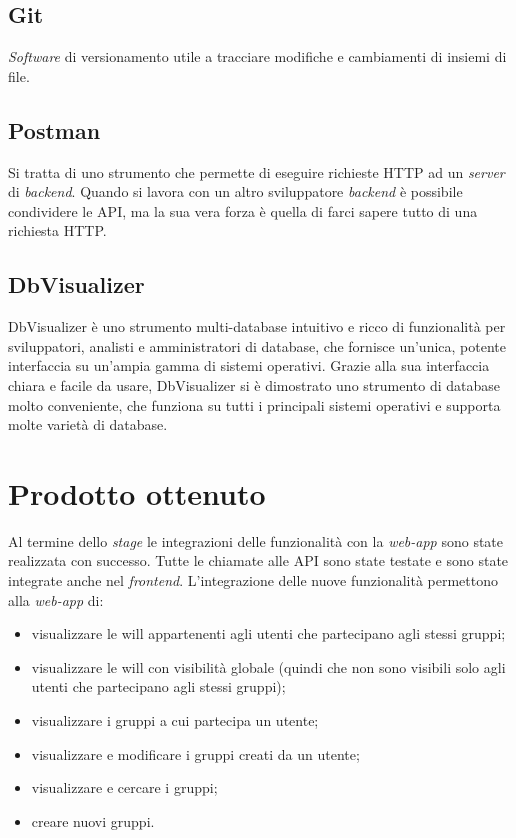 \subsection{Git}
\textit{Software} di versionamento utile a tracciare modifiche e cambiamenti di insiemi di file.
\subsection{Postman}
Si tratta di uno strumento che permette di eseguire richieste HTTP ad un \textit{server} di \textit{backend}. Quando si lavora con un altro sviluppatore 
\textit{backend} è possibile condividere le \gls{API}, ma la sua vera forza è quella di farci sapere tutto di una richiesta HTTP.
\subsection{DbVisualizer}
DbVisualizer è uno strumento multi-database intuitivo e ricco di funzionalità per sviluppatori, analisti e amministratori di database, che fornisce 
un'unica, potente interfaccia su un'ampia gamma di sistemi operativi. Grazie alla sua interfaccia chiara e facile da usare, DbVisualizer si è dimostrato 
uno strumento di database molto conveniente, che funziona su tutti i principali sistemi operativi e supporta molte varietà di database. 


\section{Prodotto ottenuto}
Al termine dello \textit{stage} le integrazioni delle funzionalità con la \textit{web-app} sono state realizzata con successo. Tutte le chiamate alle \gls{API} 
sono state testate e sono state integrate anche nel \textit{frontend}. 
L'integrazione delle nuove funzionalità permettono alla \textit{web-app} di: 
\begin{itemize}
    \item  visualizzare le \gls{will} appartenenti agli utenti che partecipano agli stessi 
    gruppi;
    \item visualizzare le \gls{will} con visibilità globale (quindi che non sono visibili solo agli utenti che partecipano agli stessi gruppi);
    \item visualizzare i gruppi a cui partecipa un utente;
    \item visualizzare e modificare i gruppi creati da un utente;
    \item visualizzare e cercare i gruppi;
    \item creare nuovi gruppi.
\end{itemize}
\pagebreak
